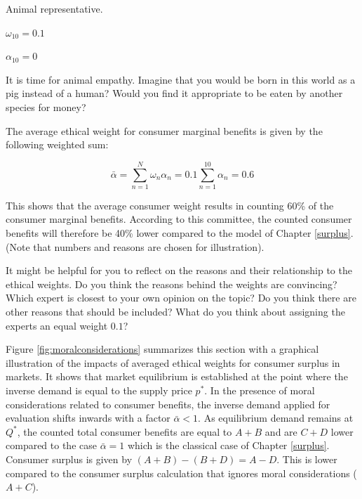 \documentclass[
]{book}
\begin{document}
Animal representative.

\(\omega_{10} = 0.1\)

\(\alpha_{10} = 0\)

It is time for animal empathy. Imagine that you would be born in this world as a pig instead of a human? Would you find it appropriate to be eaten by another species for money?

The average ethical weight for consumer marginal benefits is given by the following weighted sum:

\begin{equation}
 \bar{\alpha} = \sum_{n=1}^N \omega_n \alpha_n = 0.1 \sum_{n=1}^{10} \alpha_n = 0.6
\end{equation}

This shows that the average consumer weight results in counting 60\% of the consumer marginal benefits. According to this committee, the counted consumer benefits will therefore be 40\% lower compared to the model of Chapter \ref{surplus}. (Note that numbers and reasons are chosen for illustration).

It might be helpful for you to reflect on the reasons and their relationship to the ethical weights. Do you think the reasons behind the weights are convincing? Which expert is closest to your own opinion on the topic? Do you think there are other reasons that should be included? What do you think about assigning the experts an equal weight \(0.1\)?

Figure \ref{fig:moralconsiderations} summarizes this section with a graphical illustration of the impacts of averaged ethical weights for consumer surplus in markets. It shows that market equilibrium is established at the point where the inverse demand is equal to the supply price \(p^*\). In the presence of moral considerations related to consumer benefits, the inverse demand applied for evaluation shifts inwards with a factor \(\bar{\alpha} < 1\). As equilibrium demand remains at \(Q^*\), the counted total consumer benefits are equal to \(A+B\) and are \(C+D\) lower compared to the case \(\bar{\alpha} = 1\) which is the classical case of Chapter \ref{surplus}. Consumer surplus is given by \((A+B)-(B+D)=A-D\). This is lower compared to the consumer surplus calculation that ignores moral considerations (\(A+C\)).
\end{document}

